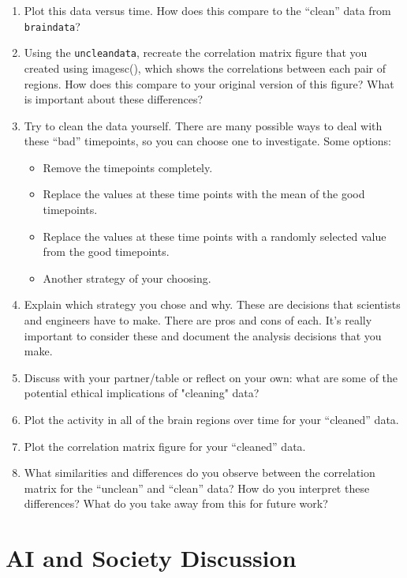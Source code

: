 \begin{prob}
\begin{enumerate}
\begin{enumerate}
	\item Plot this data versus time. How does this compare to the ``clean'' data from \texttt{braindata}?
	\item Using the \texttt{uncleandata}, recreate the correlation matrix figure that you created using imagesc(), which shows the correlations between each pair of regions.  How does this compare to your original version of this figure? What is important about these differences?
	\item Try to clean the data yourself. There are many possible ways to deal with these ``bad'' timepoints, so you can choose one to investigate. Some options:
	\begin{itemize}
	\item Remove the timepoints completely.
	\item Replace the values at these time points with the mean of the good timepoints.
	\item Replace the values at these time points with a randomly selected value from the good timepoints.
	\item Another strategy of your choosing.
	\end{itemize}
\item Explain which strategy you chose and why. These are decisions that scientists and engineers have to make. There are pros and cons of each. It's really important to consider these and document the analysis decisions that you make.	
\item Discuss with your partner/table or reflect on your own: what are some of the potential ethical implications of "cleaning" data?

\item Plot the activity in all of the brain regions over time for your ``cleaned'' data.
\item Plot the correlation matrix figure for your ``cleaned'' data.
\item What similarities and differences do you observe between the correlation matrix for the ``unclean'' and ``clean'' data? How do you interpret these differences? What do you take away from this for future work?
\end{enumerate}
\end{enumerate}
\end{prob}

\section{AI and Society Discussion}

